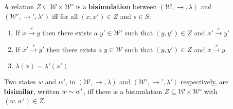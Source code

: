 \NI A relation $Z \subseteq \mathcal{W} \times \mathcal{W}'$ is a {\bf
  bisimulation} between $(\mathcal{W}, \rightarrow, \lambda)$ and
$(\mathcal{W}', \rightarrow', \lambda')$ iff for all $(x,x') \in Z$
and $s \in S$:

\begin{enumerate}

\item If $x \xrightarrow{s} y$ then there exists a $y' \in
  \mathcal{W}'$ such that $(y,y') \in Z$ and $x' \xrightarrow{s} y'$

\item If $x' \xrightarrow{s} y'$ then there exists a $y \in
  \mathcal{W}$ such that $(y,y') \in Z$ and $x \xrightarrow{s} y$

\item $\lambda(x) = \lambda'(x')$

\end{enumerate}

\begin{definition}
Two states $w$ and $w'$, in $(\mathcal{W}, \rightarrow, \lambda)$ and
$(\mathcal{W}', \rightarrow', \lambda')$ respectively, are {\bf
  bisimilar}, written $w \sim w'$, iff there is a bisimulation $Z
\subseteq \mathcal{W} \times \mathcal{W}'$ with $(w,w') \in Z$.
\end{definition}

